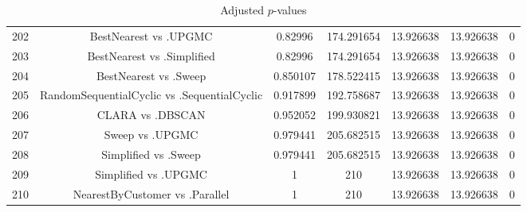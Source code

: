 \documentclass[a4paper,10pt]{article}
\begin{document}
\begin{landscape}
\begin{table}[!htp]
\begin{tabular}{ccccccc}
202&BestNearest vs .UPGMC&0.82996&174.291654&13.926638&13.926638&0\\
203&BestNearest vs .Simplified&0.82996&174.291654&13.926638&13.926638&0\\
204&BestNearest vs .Sweep&0.850107&178.522415&13.926638&13.926638&0\\
205&RandomSequentialCyclic vs .SequentialCyclic&0.917899&192.758687&13.926638&13.926638&0\\
206&CLARA vs .DBSCAN&0.952052&199.930821&13.926638&13.926638&0\\
207&Sweep vs .UPGMC&0.979441&205.682515&13.926638&13.926638&0\\
208&Simplified vs .Sweep&0.979441&205.682515&13.926638&13.926638&0\\
209&Simplified vs .UPGMC&1&210&13.926638&13.926638&0\\
210&NearestByCustomer vs .Parallel&1&210&13.926638&13.926638&0\\
\hline
\end{tabular}
\caption{Adjusted $p$-values}
\end{table}

\end{landscape}
\end{document}
